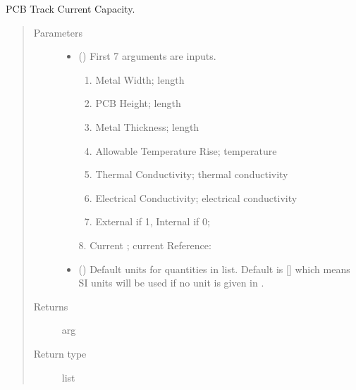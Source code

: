 \documentclass[letterpaper,10pt,english]{sphinxmanual}
\begin{document}

\begin{fulllineitems}
\label{\detokenize{components:components.PCBTrackCurrentCapacity}}
PCB Track Current Capacity.
\begin{quote}\begin{description}
\item[{Parameters}] \leavevmode\begin{itemize}
\item {} 
 () \textendash{} 
First 7 arguments are inputs.
\begin{enumerate}
%
\item {} 
Metal Width;  length

\item {} 
PCB Height;     length

\item {} 
Metal Thickness;        length

\item {} 
Allowable Temperature Rise; temperature

\item {} 
Thermal Conductivity;  thermal conductivity

\item {} 
Electrical Conductivity; electrical conductivity

\item {} 
External if 1, Internal if 0;

\end{enumerate}

8. Current ; current
Reference:


\item {} 
 (\sphinxstyleliteralemphasis{\sphinxupquote{, }}) \textendash{} Default units for quantities in  list. Default is {[}{]} which means SI units will be used if no unit is given in .

\end{itemize}

\item[{Returns}] \leavevmode
arg

\item[{Return type}] \leavevmode
list

\end{description}\end{quote}

\end{fulllineitems}
\end{document}
